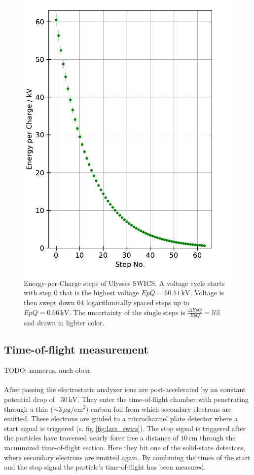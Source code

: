 %
\begin{figure}[h]
		\centering
		\includegraphics[scale = 0.7]{Figures/epq_err.pdf}
		\caption{Energy-per-Charge steps of Ulysses SWICS. A voltage cycle starts with step 0 that is the highest voltage $EpQ = 60.51\, \mathrm{kV}$. Voltage is then swept down 64 logarithmically spaced steps up to $EpQ = 0.66\, \mathrm{kV}$. The uncertainty of the single steps is $\frac{\Delta EpQ}{EpQ} = 5\%$ and drawn in lighter color.
		} \label{fig:epq}
\end{figure}
%
%
%
\subsection{Time-of-flight measurement}
TODO: numerus, auch oben\\ \\
After passing the electrostatic analyzer ions are post-accelerated by an constant potential drop of ~$30\,\mathrm{kV}$. They enter the time-of-flight chamber with penetrating through a thin ($\sim 3\,\mu \mathrm{g / cm^2}$) carbon foil from which secondary electrons are emitted. These electrons are guided to a microchannel plate detector where a start signal is triggered (s. fig \ref{fig:lars_swics}). The stop signal is triggered after the particles have traversed nearly force free a distance of $10\,\mathrm{cm}$ through the vacuumized time-of-flight section. Here they hit one of the solid-state detectors, where secondary electrons are emitted again. By combining the times of the start and the stop signal the particle's time-of-flight has been measured.
